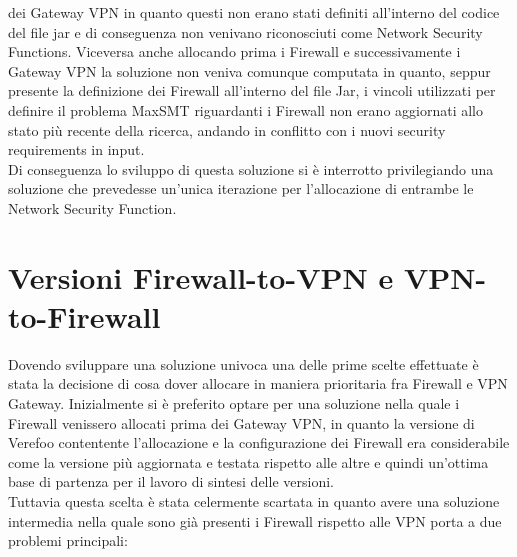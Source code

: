 dei Gateway VPN in quanto questi non erano stati definiti all'interno del codice del file jar e di conseguenza non venivano riconosciuti come Network Security Functions. Viceversa anche allocando prima i Firewall e successivamente i Gateway VPN la soluzione non veniva comunque computata in quanto, seppur presente la definizione dei Firewall all'interno del file Jar,
i vincoli utilizzati per definire il problema MaxSMT riguardanti i Firewall non erano aggiornati allo stato più recente della ricerca, andando in conflitto con i nuovi security requirements in input.\\
Di conseguenza lo sviluppo di questa soluzione si è interrotto privilegiando una soluzione che prevedesse un'unica iterazione per l'allocazione di entrambe le Network Security Function.

\section{Versioni Firewall-to-VPN e VPN-to-Firewall}

Dovendo sviluppare una soluzione univoca una delle prime scelte effettuate è stata la decisione di cosa dover allocare in maniera prioritaria fra Firewall e VPN Gateway.
Inizialmente si è preferito optare per una soluzione nella quale i Firewall venissero allocati prima dei Gateway VPN, in quanto la versione di Verefoo contentente l'allocazione e la configurazione dei Firewall era considerabile come la versione più aggiornata e testata rispetto alle altre e quindi un'ottima base di partenza per il lavoro di sintesi delle versioni.\\
Tuttavia questa scelta è stata celermente scartata in quanto avere una soluzione intermedia nella quale sono già presenti i Firewall rispetto alle VPN porta a due problemi principali:

